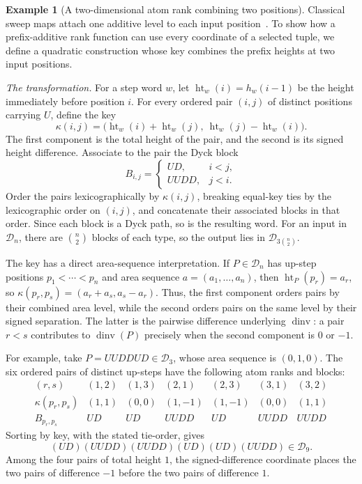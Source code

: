 \documentclass[11pt]{article}
\theoremstyle{definition}
\newtheorem{example}[theorem]{Example}
\newcommand{\D}{\mathcal D}
\newcommand{\dinv}{\operatorname{dinv}}
\begin{document}
\begin{example}[A two-dimensional atom rank combining two positions]
\label{ex:two-coordinate-rank}
Classical sweep maps attach one additive level to each input
position~\cite{ArmstrongLoehrWarrington2015,
ArmstrongLoehrWarrington2016}.  To show how a prefix-additive rank function can
use every coordinate of a selected tuple, we define a quadratic construction
whose key combines the prefix heights at two input positions.

\vspace{0.5em}
\noindent\emph{The transformation.}
For a step word $w$, let $\operatorname{ht}_w(i)=h_w(i-1)$ be the height
immediately before position $i$.  For every ordered pair
$(i,j)$ of distinct positions carrying $U$, define the key
\[
   \kappa(i,j)
   =\bigl(\operatorname{ht}_w(i)+\operatorname{ht}_w(j),\
           \operatorname{ht}_w(j)-\operatorname{ht}_w(i)\bigr).
\]
The first component is the total height of the pair, and the second is its
signed height difference.  Associate to the pair the Dyck block
\[
   B_{i,j}=
   \begin{cases}
      UD,   & i<j,\\
      UUDD, & j<i.
   \end{cases}
\]
Order the pairs lexicographically by $\kappa(i,j)$, breaking equal-key ties by
the lexicographic order on $(i,j)$, and concatenate their associated blocks in
that order.  Since each block is a Dyck path, so is the resulting word.  For
an input in $\D_n$, there are $\binom n2$ blocks of each type, so the output
lies in $\D_{3\binom n2}$.

The key has a direct area-sequence interpretation.  If $P\in\D_n$ has
up-step positions $p_1<\cdots<p_n$ and area sequence
$a=(a_1,\ldots,a_n)$, then $\operatorname{ht}_P(p_r)=a_r$, so
$\kappa(p_r,p_s)=(a_r+a_s,a_s-a_r)$.
Thus, the first component orders pairs by their combined area level, while the
second orders pairs on the same level by their signed separation.  The latter
is the pairwise difference underlying $\dinv$: a pair $r<s$ contributes to
$\dinv(P)$ precisely when the second component is $0$ or $-1$.

For example, take $P=UUDDUD\in\D_3$, whose area sequence is $(0,1,0)$.
The six ordered pairs of distinct up-steps have the following atom ranks and
blocks:
\[
\begin{array}{c|cccccc}
(r,s) &(1,2)&(1,3)&(2,1)&(2,3)&(3,1)&(3,2)\\ \hline
\kappa(p_r,p_s)&(1,1)&(0,0)&(1,-1)&(1,-1)&(0,0)&(1,1)\\
B_{p_r,p_s}&UD&UD&UUDD&UD&UUDD&UUDD
\end{array}
\]
Sorting by key, with the stated tie-order, gives
\[
   (UD)(UUDD)(UUDD)(UD)(UD)(UUDD)\in\D_9.
\]
Among the four pairs of total height $1$, the signed-difference coordinate
places the two pairs of difference $-1$ before the two pairs of difference
$1$.


\end{example}
\end{document}
